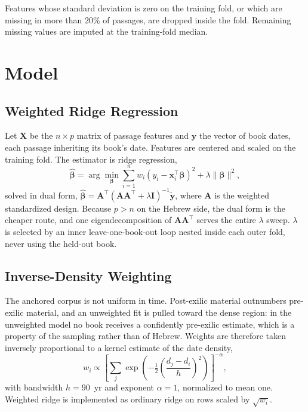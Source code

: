 \documentclass[10pt,letterpaper]{article}
\begin{document}
Features whose standard deviation is zero on the training fold, or which are
missing in more than 20\% of passages, are dropped inside the fold.  Remaining
missing values are imputed at the training-fold median.

\section*{Model}

\subsection*{Weighted Ridge Regression}

Let $\mathbf{X}$ be the $n \times p$ matrix of passage features and
$\mathbf{y}$ the vector of book dates, each passage inheriting its book's
date.  Features are centered and scaled on the training fold.  The estimator is
ridge regression,
\begin{equation}
\hat{\boldsymbol\beta}
  = \arg\min_{\boldsymbol\beta}
    \sum_{i=1}^{n} w_i \left( y_i - \mathbf{x}_i^{\!\top}\boldsymbol\beta \right)^2
    + \lambda \|\boldsymbol\beta\|^2 ,
\end{equation}
solved in dual form, $\hat{\boldsymbol\beta} =
\mathbf{A}^{\!\top}(\mathbf{A}\mathbf{A}^{\!\top} + \lambda\mathbf{I})^{-1}
\tilde{\mathbf{y}}$, where $\mathbf{A}$ is the weighted standardized design.
Because $p > n$ on the Hebrew side, the dual form is the cheaper route, and
one eigendecomposition of $\mathbf{A}\mathbf{A}^{\!\top}$ serves the entire
$\lambda$ sweep.  $\lambda$ is selected by an inner leave-one-book-out loop
nested inside each outer fold, never using the held-out book.

\subsection*{Inverse-Density Weighting}

The anchored corpus is not uniform in time.  Post-exilic material outnumbers
pre-exilic material, and an unweighted fit is pulled toward the dense region:
in the unweighted model no book receives a confidently pre-exilic estimate,
which is a property of the sampling rather than of Hebrew.  Weights are
therefore taken inversely proportional to a kernel estimate of the date
density,
\begin{equation}
w_i \propto \left[ \sum_j \exp\!\left( -\tfrac{1}{2}
  \left( \frac{d_j - d_i}{h} \right)^{\!2} \right) \right]^{-\alpha} ,
\end{equation}
with bandwidth $h = 90$~yr and exponent $\alpha = 1$, normalized to mean one.
Weighted ridge is implemented as ordinary ridge on rows scaled by
$\sqrt{w_i}$.
\end{document}
